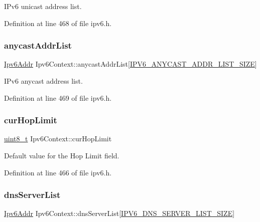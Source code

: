 I\+Pv6 unicast address list. 



Definition at line 468 of file ipv6.\+h.

\mbox{\label{structIpv6Context_a1ff294cc4f4dc7678e37f5ba6b557440}} 
\subsubsection{\texorpdfstring{anycast\+Addr\+List}{anycastAddrList}}
{\footnotesize\ttfamily \hyperlink{ipv6_8h_aed0cbc40c61ed5b4fb681ebc55237e89}{Ipv6\+Addr} Ipv6\+Context\+::anycast\+Addr\+List\mbox{[}\hyperlink{ipv6_8h_ab01594dcab02d6075c20e22954c2d872}{I\+P\+V6\+\_\+\+A\+N\+Y\+C\+A\+S\+T\+\_\+\+A\+D\+D\+R\+\_\+\+L\+I\+S\+T\+\_\+\+S\+I\+ZE}\mbox{]}}



I\+Pv6 anycast address list. 



Definition at line 469 of file ipv6.\+h.

\mbox{\label{structIpv6Context_aa1455c2834bc2547cde11287f2e99aca}} 
\subsubsection{\texorpdfstring{cur\+Hop\+Limit}{curHopLimit}}
{\footnotesize\ttfamily \hyperlink{stdint_8h_aba7bc1797add20fe3efdf37ced1182c5}{uint8\+\_\+t} Ipv6\+Context\+::cur\+Hop\+Limit}



Default value for the Hop Limit field. 



Definition at line 466 of file ipv6.\+h.

\mbox{\label{structIpv6Context_a62347c5c24f0c65b5055395f08612ae3}} 
\subsubsection{\texorpdfstring{dns\+Server\+List}{dnsServerList}}
{\footnotesize\ttfamily \hyperlink{ipv6_8h_aed0cbc40c61ed5b4fb681ebc55237e89}{Ipv6\+Addr} Ipv6\+Context\+::dns\+Server\+List\mbox{[}\hyperlink{ipv6_8h_a7ef30c7f719916efa14b509b7ef707a1}{I\+P\+V6\+\_\+\+D\+N\+S\+\_\+\+S\+E\+R\+V\+E\+R\+\_\+\+L\+I\+S\+T\+\_\+\+S\+I\+ZE}\mbox{]}}



